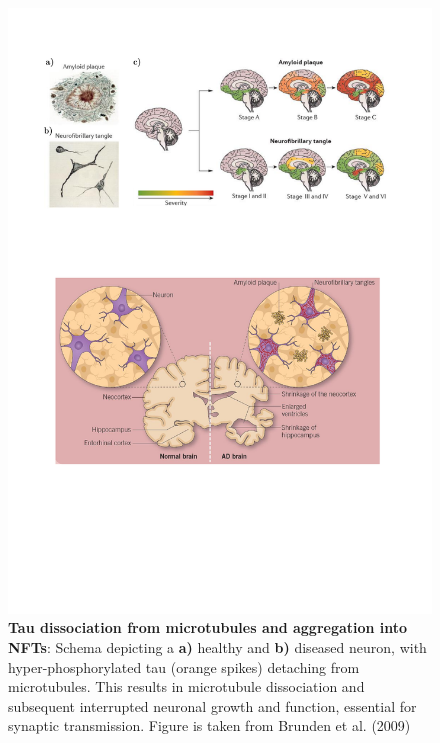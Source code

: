 \vspace{1cm}
\begin{figure}[!ht]
	\centering
	\includegraphics[page=13,trim={0 14cm 0cm 2cm},clip, scale = 0.7]{Figures/Introduction_Figures.pdf}
	\captionsetup{width=0.95\textwidth,singlelinecheck=off}
	\caption[Tau hypothesis in AD]%
	{\textbf{Tau dissociation from microtubules and aggregation into NFTs}: Schema depicting a \textbf{a)} healthy and \textbf{b)} diseased neuron, with hyper-phosphorylated tau (orange spikes) detaching from microtubules. This results in microtubule dissociation and subsequent interrupted neuronal growth and function, essential for synaptic transmission. Figure is taken from Brunden et al. (2009)\cite{Brunden2009}
	}
	\label{fig:tau_hypothesis}
\end{figure}	


